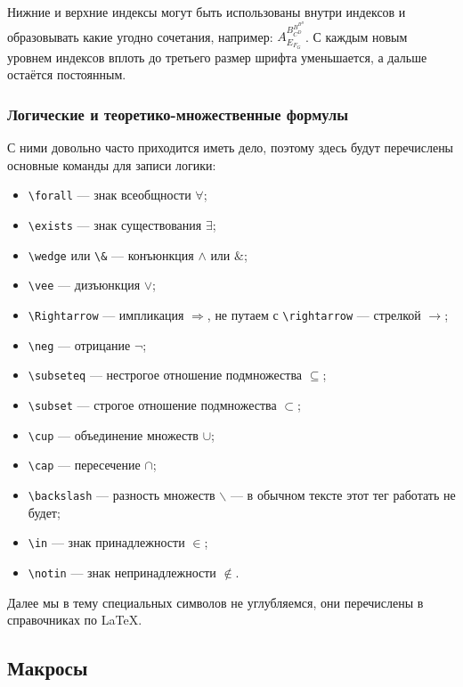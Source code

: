 \documentclass[14pt, russian]{scrartcl}
\begin{document}
Нижние и верхние индексы могут быть использованы внутри индексов и образовывать какие угодно сочетания, например: $A^{B^{B^{B^B}}_{C^D}}_{E_{F_G}}$. С каждым новым уровнем индексов вплоть до третьего размер шрифта уменьшается, а дальше остаётся постоянным.

\subsubsection{Логические и теоретико-множественные формулы}

С ними довольно часто приходится иметь дело, поэтому здесь будут перечислены основные команды для записи логики:
\begin{itemize}
\item \texttt{\textbackslash forall} --- знак всеобщности $\forall$;
\item \texttt{\textbackslash exists} --- знак существования $\exists$;
\item \texttt{\textbackslash wedge} или \texttt{\textbackslash \&} --- конъюнкция $\wedge$ или $\&$;
\item \texttt{\textbackslash vee} --- дизъюнкция $\vee$;
\item \texttt{\textbackslash Rightarrow} --- импликация $\Rightarrow$, не путаем с \texttt{\textbackslash rightarrow} --- стрелкой $\rightarrow$;
\item \texttt{\textbackslash neg} --- отрицание $\neg$;
\item \texttt{\textbackslash subseteq} --- нестрогое отношение подмножества $\subseteq$;
\item \texttt{\textbackslash subset} --- строгое отношение подмножества $\subset$;
\item \texttt{\textbackslash cup} --- объединение множеств $\cup$;
\item \texttt{\textbackslash cap} --- пересечение $\cap$;
\item \texttt{\textbackslash backslash} --- разность множеств $\backslash$ --- в обычном тексте этот тег работать не будет;
\item \texttt{\textbackslash in} --- знак принадлежности $\in$;
\item \texttt{\textbackslash notin} --- знак непринадлежности $\notin$.
\end{itemize}

Далее мы в тему специальных символов не углубляемся, они перечислены в справочниках по \LaTeX.

\subsection{Макросы}\label{Sect::Macros}
\end{document}
